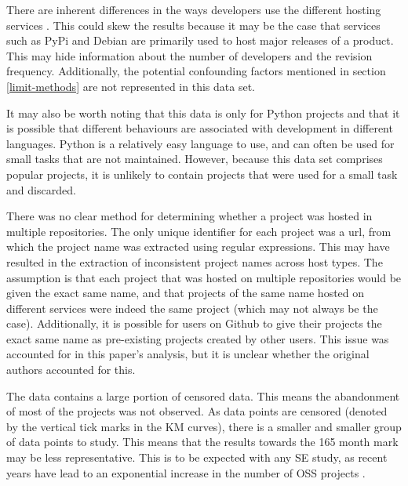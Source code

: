 \documentclass[acmconf]{acmart}
\begin{document}
There are inherent differences in the ways developers use the different hosting services .
This could skew the results because it may be the case that services such as PyPi and Debian are primarily used to host major releases of a product.
This may hide information about the number of developers and the revision frequency.
Additionally, the potential confounding factors mentioned in section \ref{limit-methods} are not represented in this data set.

It may also be worth noting that this data is only for Python projects and that it is possible that different behaviours are associated with development in different languages.
Python is a relatively easy language to use, and can often be used for small tasks that are not maintained.
However, because this data set comprises popular projects, it is unlikely to contain projects that were used for a small task and discarded.

There was no clear method for determining whether a project was hosted in multiple repositories.
The only unique identifier for each project was a url, from which the project name was extracted using regular expressions.
This may have resulted in the extraction of inconsistent project names across host types.
The assumption is that each project that was hosted on multiple repositories would be given the exact same name, and that projects of the same name hosted on different services were indeed the same project (which may not always be the case).
Additionally, it is possible for users on Github to give their projects the exact same name as pre-existing projects created by other users.
This issue was accounted for in this paper's analysis, but it is unclear whether the original authors accounted for this.

The data contains a large portion of censored data.
This means the abandonment of most of the projects was not observed.
As data points are censored (denoted by the vertical tick marks in the KM curves), there is a smaller and smaller group of data points to study.
This means that the results towards the 165 month mark may be less representative.
This is to be expected with any SE study, as recent years have lead to an exponential increase in the number of OSS projects .
\end{document}
